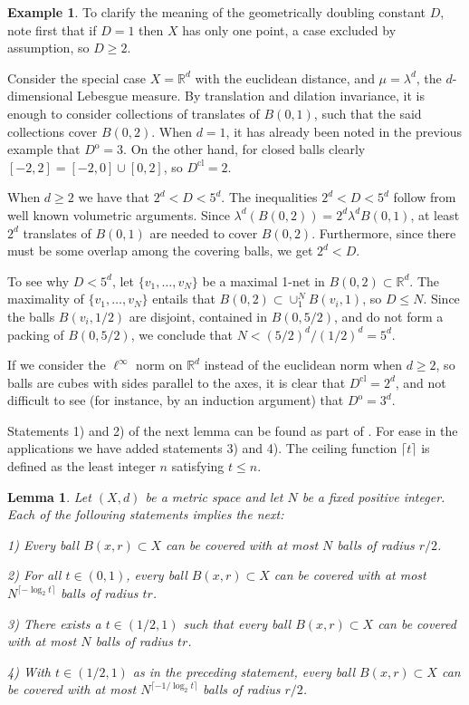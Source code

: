 \documentclass[12pt]{amsart}
\newtheorem{lemma}[theorem]{Lemma}
\theoremstyle{definition}
\newtheorem{example}[theorem]{Example}
\theoremstyle{parrafo}
\begin{document}
	
	\begin{example} \label{geomdoub} To clarify 
		the meaning of the geometrically  doubling constant $D$,  note 
		first that if $D = 1$ then $X$ has only one point, 
		a case excluded by assumption,
		so $D \ge 2$.
		
		Consider the special case $X= \mathbb{R}^d$ with the euclidean distance, 
		and $\mu = \lambda^d$, the $d$-dimensional Lebesgue measure. By translation and dilation
		invariance, 
		it is enough to consider collections of translates  of  $B(0,1)$, such that the said collections  
		cover $B(0,2)$. When $d = 1$, it has already been noted in the previous example that $D^{\operatorname{o}} = 3$. On the other hand, for closed balls clearly $[-2,2] = [-2, 0] \cup [0,2]$, so $D^{\operatorname{cl}} = 2$.
		
		
When $d \ge 2$ we have that $2^d < D < 5^d$. 
The inequalities $2^d < D <  5^d$ follow from
		well known volumetric arguments.  Since $ \lambda^d (B(0,2)) = 
		2^d \lambda^d  B(0,1)$, at least $2^d$ translates of $B(0,1)$ are needed to cover $B(0,2)$.
		Furthermore, since there must be some overlap among the covering balls, we get 
		$2^d < D$. 
		
		To see why $D <  5^d$, let $\{v_1, \dots, v_N\}$ be a maximal  1-net in  $B(0,2) \subset \mathbb{R}^d$. The maximality of 
		$\{v_1, \dots, v_N\}$  entails that
		$B(0,2)   \subset   \cup_1^N B(v_i, 1)$, so $D \le N$. Since the balls $B(v_i, 1/2)$  
		are disjoint, contained in  $B(0, 5/2)$, and do not form a packing of $B(0, 5/2)$, we conclude that $N <  (5/2)^d/(1/2)^d = 5^d$.
		
 If we consider the $\ell^\infty$ norm on  $\mathbb{R}^d$ instead of the euclidean norm when $d \ge 2$,
		so balls are cubes with sides parallel to the axes,
		it is clear that $D^{\operatorname{cl}} = 2^d$, and not difficult to
		see (for instance, by an induction argument) that
		$D^{\operatorname{o}} = 3^d$.
	\end{example}
	
	
	Statements 1) and 2) of the next lemma can be found as part of \cite[Lemma 2.3]{Hy}. For ease in the applications we have added statements 3) and 4).
	The ceiling function 
	$\lceil  t \rceil$ is defined as the least integer $n$ satisfying $t\le n$.
	
	\begin{lemma}\label{hyt}  Let $(X, d)$ be a metric space and let $N$ be a fixed positive integer. 
		Each of the following statements implies the next:
		
		1) Every ball $B(x, r)\subset X$ can be covered with at most $N$ balls of radius $r/2$.
		
		
		2)  For all $t\in (0,1)$, every ball $B(x, r)\subset X$ can be covered with at most $N^{\lceil - \log_2 t \rceil}$ balls of radius $t r$.
		
		3) There exists a $t\in (1/2, 1)$ such that every ball $B(x, r)\subset X$ can be covered with at most $N$ balls of radius $t r$.
		
		4)  With $t\in (1/2,1)$ as in the preceding statement, every ball $B(x, r)\subset X$ can be covered with at most $N^{\lceil - 1/ \log_2 t \rceil}$ balls of radius
		$r/2$.
					\end{lemma}
	
\end{document}
